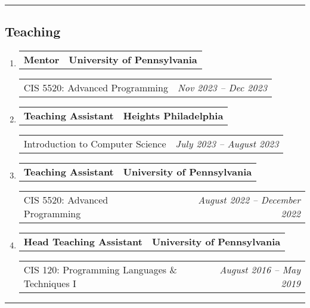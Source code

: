 \documentclass[letterpaper]{article}
\makeatletter
\newif\iflong
\newcommand*{\tabulardef}[3]{\begin{tabular}[t]{@{}lp{\dimexpr\linewidth-#1}@{}}
    #2&#3
\end{tabular}}
\newcommand{\headerrow}[2]
{\begin{tabular*}{\linewidth}{l@{\extracolsep{\fill}}r}
	#1 &
	#2 \\
\end{tabular*}}
\makeatother
\begin{document}
\hrule
\subsection*{Teaching}
\begin{enumerate}[label=]
	\parskip=-0.05em

    \item
        \headerrow
            {\textbf{Mentor}}
            {\textbf{University of Pennsylvania}}
        \headerrow
            {CIS 5520: Advanced Programming}
            {\emph{Nov 2023 -- Dec 2023}}
        \iflong
        \begin{enumerate}[label= *]
            \parskip=-0.1em
        \item\tabulardef{5cm}{}{Advise student groups on a final project of their choosing in Haskell showcasing the material covered over the course of the semester}
        \end{enumerate}
        \fi

    \item
		\headerrow
			{\textbf{Teaching Assistant}}
			{\textbf{Heights Philadelphia}}
	\headerrow
		{Introduction to Computer Science}
		{\emph{July 2023 -- August 2023}}
    \iflong
	\begin{enumerate}[label= *]
		\parskip=-0.1em
    \item\tabulardef{5cm}{}{Introduce computer science to middle school students from underrepresented backgrounds in STEM using various in-class exercises}
	\end{enumerate}
    \fi

	\item
		\headerrow
			{\textbf{Teaching Assistant}}
			{\textbf{University of Pennsylvania}}
	\headerrow
		{CIS 5520: Advanced Programming}
		{\emph{August 2022 -- December 2022}}
    \iflong
	\begin{enumerate}[label= *]
		\parskip=-0.1em
        \item\tabulardef{5cm}{}{Assist with in-class discussion and cooperative exercises centered around functional programming patterns in the Haskell programming language}        
        \item\tabulardef{5cm}{}{Advise student groups on a final project of their choosing in Haskell showcasing the material covered over the course of the semester}
	\end{enumerate}
    \fi

	\item
		\headerrow
			{\textbf{Head Teaching Assistant}}
			{\textbf{University of Pennsylvania}}
	\headerrow
		{CIS 120: Programming Languages \& Techniques I}
		{\emph{August 2016 -- May 2019}}
    \iflong
	\begin{enumerate}[label= *]
		\parskip=-0.1em
        \item\tabulardef{5cm}{}{Co-lead and prepare a weekly recitation to review course material on core programming languages and techniques, taught in OCaml and then Java}
		\item Hire and train new teaching assistants
	\end{enumerate}
    \fi
\end{enumerate}
\hrule
\end{document}
